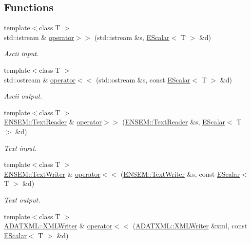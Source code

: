 \subsection*{Functions}
\begin{DoxyCompactItemize}
\item 
{\footnotesize template$<$class T $>$ }\\std\+::istream \& \mbox{\hyperlink{group__escalar_gae1745a4a5cc3b43ab391d57412135dbd}{operator$>$$>$}} (std\+::istream \&s, \mbox{\hyperlink{classENSEM_1_1EScalar}{E\+Scalar}}$<$ T $>$ \&d)
\begin{DoxyCompactList}\small\item\em Ascii input. \end{DoxyCompactList}\item 
{\footnotesize template$<$class T $>$ }\\std\+::ostream \& \mbox{\hyperlink{group__escalar_ga2a24d07560f549aee97bb63ceed9ed50}{operator$<$$<$}} (std\+::ostream \&s, const \mbox{\hyperlink{classENSEM_1_1EScalar}{E\+Scalar}}$<$ T $>$ \&d)
\begin{DoxyCompactList}\small\item\em Ascii output. \end{DoxyCompactList}\item 
{\footnotesize template$<$class T $>$ }\\\mbox{\hyperlink{classENSEM_1_1TextReader}{E\+N\+S\+E\+M\+::\+Text\+Reader}} \& \mbox{\hyperlink{group__escalar_ga0011ba4db6e989d9517d29f0dd411ba4}{operator$>$$>$}} (\mbox{\hyperlink{classENSEM_1_1TextReader}{E\+N\+S\+E\+M\+::\+Text\+Reader}} \&s, \mbox{\hyperlink{classENSEM_1_1EScalar}{E\+Scalar}}$<$ T $>$ \&d)
\begin{DoxyCompactList}\small\item\em Text input. \end{DoxyCompactList}\item 
{\footnotesize template$<$class T $>$ }\\\mbox{\hyperlink{classENSEM_1_1TextWriter}{E\+N\+S\+E\+M\+::\+Text\+Writer}} \& \mbox{\hyperlink{group__escalar_ga4fa895e4a145c879739c3f8497717e98}{operator$<$$<$}} (\mbox{\hyperlink{classENSEM_1_1TextWriter}{E\+N\+S\+E\+M\+::\+Text\+Writer}} \&s, const \mbox{\hyperlink{classENSEM_1_1EScalar}{E\+Scalar}}$<$ T $>$ \&d)
\begin{DoxyCompactList}\small\item\em Text output. \end{DoxyCompactList}\item 
{\footnotesize template$<$class T $>$ }\\\mbox{\hyperlink{classADATXML_1_1XMLWriter}{A\+D\+A\+T\+X\+M\+L\+::\+X\+M\+L\+Writer}} \& \mbox{\hyperlink{group__escalar_gae78b4ef06a7e72aa75cae11dd9c48327}{operator$<$$<$}} (\mbox{\hyperlink{classADATXML_1_1XMLWriter}{A\+D\+A\+T\+X\+M\+L\+::\+X\+M\+L\+Writer}} \&xml, const \mbox{\hyperlink{classENSEM_1_1EScalar}{E\+Scalar}}$<$ T $>$ \&d)

\end{DoxyCompactItemize}
